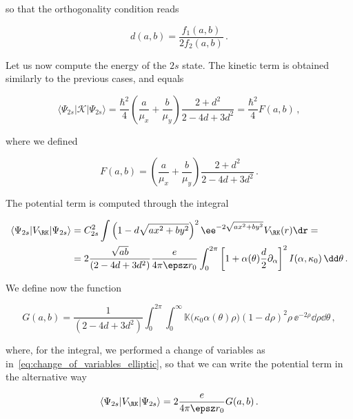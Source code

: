 \noindent so that the orthogonality condition reads

\begin{equation}
    d (a,b) = \frac{f_1 (a,b)}{2 f_2 (a,b)} \,.
\end{equation}

Let us now compute the energy of the $2s$ state.
The kinetic term is obtained similarly to the previous cases, and equals

\begin{equation}
    \langle\Psi_{2s}| \mathcal{K}|\Psi_{2s}\rangle = \frac{\hbar^{2}}{4}\!\left(\frac{a}{\mu_{x}}+\frac{b}{\mu_{y}}\right) \frac{2 + d^2}{2 - 4d + 3d^2}  = \frac{\hbar^{2}}{4} F(a,b) \,,
\end{equation}

\noindent where we defined

\begin{equation}
    F(a,b) = \left(\frac{a}{\mu_{x}}+\frac{b}{\mu_{y}}\right) \frac{2 + d^2}{2 - 4d + 3d^2} \,.
\end{equation}

\noindent The potential term is computed through the integral

\begin{equation}
    \begin{aligned}
        \langle\Psi_{2s}|V_{\RK}|\Psi_{2s}\rangle &= C_{2s}^2 \int \left(1 - d \sqrt{ax^{2}+by^{2}} \right)^2 \ee^{-2 \sqrt{ax^{2}+by^{2}}} V_{\RK}(r) \dr= \\
                                            &= 2 \frac{\sqrt{a b}}{ (2 - 4d + 3 d^2)}  \frac{e}{4 \pi \epsz r_0} \int_0^{2 \pi} \left[1 + \alpha (\theta) \frac{d}{2} \partial_\alpha \right]^2 I(\alpha, \kappa_0) \, \dd \theta \,.
    \end{aligned}
\end{equation}

\noindent We define now the function

\begin{equation}
    G(a, b) = \frac{1}{ (2 - 4d + 3 d^2)}  \int_0^{2 \pi} \int_0^\infty \mathds{K}\big(\kappa_0 \alpha(\theta) \rho \big) (1- d \rho)^2 \rho\, \ee^{-2 \rho} \dd \rho \dd \theta \,,
\end{equation}

\noindent where, for the integral, we performed a change of variables as in~\eqref{eq:change_of_variables_elliptic}, so that we can write the potential term in the alternative way

\begin{equation}
    \langle\Psi_{2s}|V_{\RK}|\Psi_{2s}\rangle = 2  \frac{e}{4 \pi \epsz  r_0} G(a, b) \,.
\end{equation}


